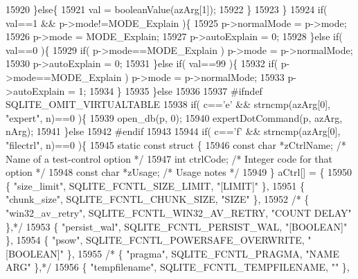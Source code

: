 \begin{DoxyCode}
{{{{{{{{{{{{{15920       \}\textcolor{keywordflow}{else}\{
15921         val =  booleanValue(azArg[1]);
15922       \}
15923     \}
15924     \textcolor{keywordflow}{if}( val==1 && p->mode!=MODE_Explain )\{
15925       p->normalMode = p->mode;
15926       p->mode = MODE_Explain;
15927       p->autoExplain = 0;
15928     \}\textcolor{keywordflow}{else} \textcolor{keywordflow}{if}( val==0 )\{
15929       \textcolor{keywordflow}{if}( p->mode==MODE_Explain ) p->mode = p->normalMode;
15930       p->autoExplain = 0;
15931     \}\textcolor{keywordflow}{else} \textcolor{keywordflow}{if}( val==99 )\{
15932       \textcolor{keywordflow}{if}( p->mode==MODE_Explain ) p->mode = p->normalMode;
15933       p->autoExplain = 1;
15934     \}
15935   \}\textcolor{keywordflow}{else}
15936 
15937 \textcolor{preprocessor}{#ifndef SQLITE\_OMIT\_VIRTUALTABLE}
15938   \textcolor{keywordflow}{if}( c==\textcolor{charliteral}{'e'} && strncmp(azArg[0], \textcolor{stringliteral}{"expert"}, n)==0 )\{
15939     open_db(p, 0);
15940     expertDotCommand(p, azArg, nArg);
15941   \}\textcolor{keywordflow}{else}
15942 \textcolor{preprocessor}{#endif}
15943 
15944   \textcolor{keywordflow}{if}( c==\textcolor{charliteral}{'f'} && strncmp(azArg[0], \textcolor{stringliteral}{"filectrl"}, n)==0 )\{
15945     \textcolor{keyword}{static} \textcolor{keyword}{const} \textcolor{keyword}{struct }\{
15946        \textcolor{keyword}{const} \textcolor{keywordtype}{char} *zCtrlName;   \textcolor{comment}{/* Name of a test-control option */}
15947        \textcolor{keywordtype}{int} ctrlCode;            \textcolor{comment}{/* Integer code for that option */}
15948        \textcolor{keyword}{const} \textcolor{keywordtype}{char} *zUsage;      \textcolor{comment}{/* Usage notes */}
15949     \} aCtrl[] = \{
15950       \{ \textcolor{stringliteral}{"size\_limit"},     SQLITE_FCNTL_SIZE_LIMIT,      \textcolor{stringliteral}{"[LIMIT]"}        \},
15951       \{ \textcolor{stringliteral}{"chunk\_size"},     SQLITE_FCNTL_CHUNK_SIZE,      \textcolor{stringliteral}{"SIZE"}           \},
15952    \textcolor{comment}{/* \{ "win32\_av\_retry", SQLITE\_FCNTL\_WIN32\_AV\_RETRY,  "COUNT DELAY"    \},*/}
15953       \{ \textcolor{stringliteral}{"persist\_wal"},    SQLITE_FCNTL_PERSIST_WAL,     \textcolor{stringliteral}{"[BOOLEAN]"}      \},
15954       \{ \textcolor{stringliteral}{"psow"},       SQLITE_FCNTL_POWERSAFE_OVERWRITE, \textcolor{stringliteral}{"[BOOLEAN]"}      \},
15955    \textcolor{comment}{/* \{ "pragma",         SQLITE\_FCNTL\_PRAGMA,          "NAME ARG"       \},*/}
15956       \{ \textcolor{stringliteral}{"tempfilename"},   SQLITE_FCNTL_TEMPFILENAME,    \textcolor{stringliteral}{""}               \},
}}}}}}}}}}}}}
\end{DoxyCode}
